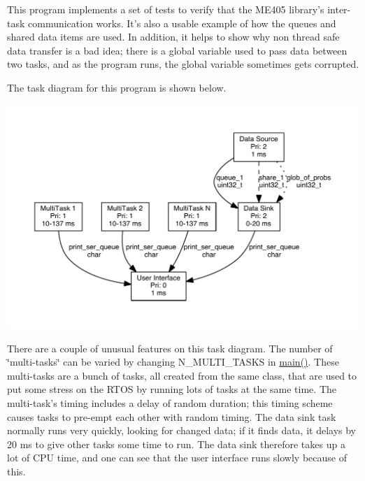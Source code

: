 This program implements a set of tests to verify that the M\+E405 library's inter-\/task communication works. It's also a usable example of how the queues and shared data items are used. In addition, it helps to show why non thread safe data transfer is a bad idea; there is a global variable used to pass data between two tasks, and as the program runs, the global variable sometimes gets corrupted.

The task diagram for this program is shown below. \begin{center}

\begin{DoxyImageNoCaption}
  \mbox{\includegraphics[width=\textwidth,height=\textheight/2,keepaspectratio=true]{dot_inline_dotgraph_1}}
\end{DoxyImageNoCaption}
\end{center}
 There are a couple of unusual features on this task diagram. The number of \char`\"{}multi-\/tasks\char`\"{} can be varied by changing {\ttfamily N\+\_\+\+M\+U\+L\+T\+I\+\_\+\+T\+A\+S\+K\+S} in {\ttfamily \hyperlink{test__main_8cpp_a840291bc02cba5474a4cb46a9b9566fe}{main()}}. These multi-\/tasks are a bunch of tasks, all created from the same class, that are used to put some stress on the R\+T\+O\+S by running lots of tasks at the same time. The multi-\/task's timing includes a delay of random duration; this timing scheme causes tasks to pre-\/empt each other with random timing. The data sink task normally runs very quickly, looking for changed data; if it finds data, it delays by 20 ms to give other tasks some time to run. The data sink therefore takes up a lot of C\+P\+U time, and one can see that the user interface runs slowly because of this.

